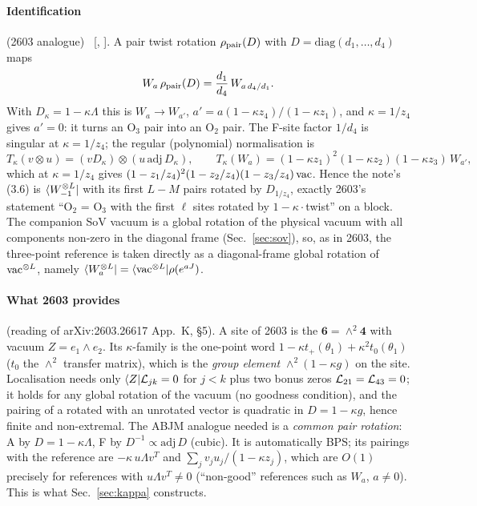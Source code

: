 \paragraph{Identification} (2603 analogue) \npy\ [, ]. A pair twist rotation
$\rho_{\rm pair}(D)$ with $D=\mathrm{diag}(d_1,\dots,d_4)$ maps
\begin{equation}\label{eq:3pt-rot}
 W_a\,\rho_{\rm pair}(D)=\frac{d_1}{d_4}\,W_{a\,d_4/d_1}.
\end{equation}
With $D_\kappa=1-\kappa\Lambda$ this is $W_a\to W_{a'}$, $a'=a(1-\kappa z_4)/(1-\kappa z_1)$, and $\kappa=1/z_4$ gives $a'=0$:
it turns an O$_3$ pair into an O$_2$ pair. The F-site factor $1/d_4$ is singular at $\kappa=1/z_4$; the regular
(polynomial) normalisation is
\begin{equation}\label{eq:3pt-T}
 T_\kappa(v\otimes u)=(vD_\kappa)\otimes(u\,\mathrm{adj}\,D_\kappa),\qquad
 T_\kappa(W_a)=(1-\kappa z_1)^2(1-\kappa z_2)(1-\kappa z_3)\,W_{a'} ,
\end{equation}
which at $\kappa=1/z_4$ gives $(1-z_1/z_4)^2(1-z_2/z_4)(1-z_3/z_4)\,\mathrm{vac}$. Hence the note's (3.6) is
$\langle W_{-1}^{\otimes L}|$ with its first $L-M$ pairs rotated by $D_{1/z_4}$, exactly 2603's statement
``O$_2$ = O$_3$ with the first $\ell$ sites rotated by $1-\kappa\cdot$twist'' on a block. The companion SoV vacuum is a global
rotation of the physical vacuum with all components non-zero in the diagonal frame (Sec.~\ref{sec:sov}), so, as in 2603,
the three-point reference is taken directly as a diagonal-frame global rotation of $\mathrm{vac}^{\otimes L}$, namely
$\langle W_a^{\otimes L}|=\langle\mathrm{vac}^{\otimes L}|\rho(e^{aJ})$.

\paragraph{What 2603 provides} (reading of arXiv:2603.26617 App.~K,  \S5). A site of 2603 is the
$\mathbf6=\wedge^2\mathbf4$ with vacuum $Z=e_1\wedge e_2$. Its $\kappa$-family is the one-point word
$1-\kappa t_+(\theta_1)+\kappa^2t_0(\theta_1)$ ($t_0$ the $\wedge^2$ transfer matrix), which is the \emph{group element}
$\wedge^2(1-\kappa g)$ on the site. Localisation needs only $\langle Z|\mathcal L_{jk}=0$ for $j<k$ plus two bonus zeros $\mathcal L_{21}=\mathcal L_{43}=0$;
it holds for any global rotation of the vacuum (no goodness condition), and the pairing of a rotated with an unrotated
vector is quadratic in $D=1-\kappa g$, hence finite and non-extremal. The ABJM analogue needed is a \emph{common pair
rotation}: A by $D=1-\kappa\Lambda$, F by $D^{-1}\propto\mathrm{adj}\,D$ (cubic). It is automatically BPS; its pairings with the
reference are $-\kappa\,u\Lambda v^T$ and $\sum_jv_ju_j/(1-\kappa z_j)$, which are $O(1)$ precisely for references with
$u\Lambda v^T\ne0$ (``non-good'' references such as $W_a$, $a\ne0$). This is what Sec.~\ref{sec:kappa} constructs.

